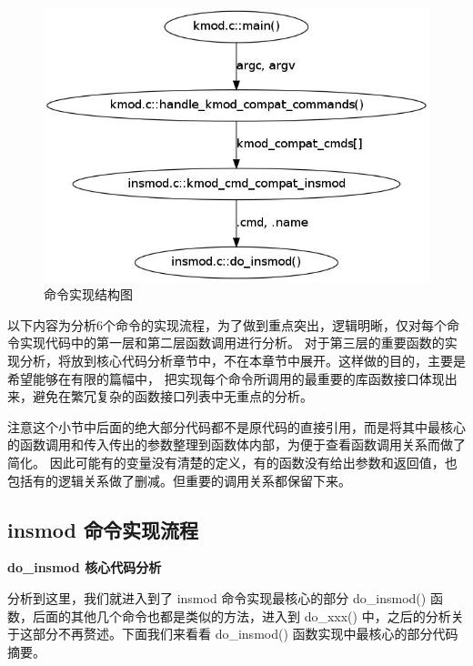 \begin{figure}[htbp]
\centering
\includegraphics{./figures/cmd.jpg}
\caption{命令实现结构图}
\end{figure}

以下内容为分析6个命令的实现流程，为了做到重点突出，逻辑明晰，仅对每个命令实现代码中的第一层和第二层函数调用进行分析。
对于第三层的重要函数的实现分析，将放到核心代码分析章节中，不在本章节中展开。这样做的目的，主要是希望能够在有限的篇幅中，
把实现每个命令所调用的最重要的库函数接口体现出来，避免在繁冗复杂的函数接口列表中无重点的分析。

注意这个小节中后面的绝大部分代码都不是原代码的直接引用，而是将其中最核心的函数调用和传入传出的参数整理到函数体内部，为便于查看函数调用关系而做了简化。
因此可能有的变量没有清楚的定义，有的函数没有给出参数和返回值，也包括有的逻辑关系做了删减。但重要的调用关系都保留下来。

\subsection{insmod 命令实现流程}

\textbf{do\_insmod 核心代码分析}

分析到这里，我们就进入到了 insmod 命令实现最核心的部分 do\_insmod()
函数，后面的其他几个命令也都是类似的方法，进入到 do\_xxx()
中，之后的分析关于这部分不再赘述。下面我们来看看 do\_insmod()
函数实现中最核心的部分代码摘要。

